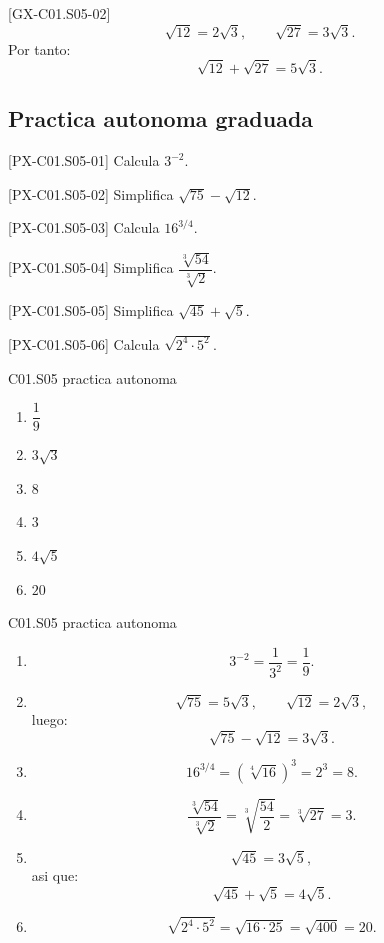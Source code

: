 \begin{fullsolution}{[GX-C01.S05-02]}
\[
\sqrt{12}=2\sqrt{3},\qquad \sqrt{27}=3\sqrt{3}.
\]
Por tanto:
\[
\sqrt{12}+\sqrt{27}=5\sqrt{3}.
\]
\end{fullsolution}

\subsection*{Practica autonoma graduada}
\begin{exercise}{[PX-C01.S05-01] Calcula \(3^{-2}\).}
\end{exercise}
\begin{exercise}{[PX-C01.S05-02] Simplifica \(\sqrt{75}-\sqrt{12}\).}
\end{exercise}
\begin{exercise}{[PX-C01.S05-03] Calcula \(16^{3/4}\).}
\end{exercise}
\begin{exercise}{[PX-C01.S05-04] Simplifica \(\dfrac{\sqrt[3]{54}}{\sqrt[3]{2}}\).}
\end{exercise}
\begin{exercise}{[PX-C01.S05-05] Simplifica \(\sqrt{45}+\sqrt{5}\).}
\end{exercise}
\begin{exercise}{[PX-C01.S05-06] Calcula \(\sqrt{2^4\cdot 5^2}\).}
\end{exercise}

\begin{shortanswer}{C01.S05 practica autonoma}
\begin{enumerate}[label=\textbf{PX-C01.S05-\arabic*:}, leftmargin=*]
  \item \(\dfrac{1}{9}\)
  \item \(3\sqrt{3}\)
  \item \(8\)
  \item \(3\)
  \item \(4\sqrt{5}\)
  \item \(20\)
\end{enumerate}
\end{shortanswer}

\begin{fullsolution}{C01.S05 practica autonoma}
\begin{enumerate}[label=\textbf{PX-C01.S05-\arabic*:}, leftmargin=*]
  \item
  \[
  3^{-2}=\frac{1}{3^2}=\frac{1}{9}.
  \]
  \item
  \[
  \sqrt{75}=5\sqrt{3},\qquad \sqrt{12}=2\sqrt{3},
  \]
  luego:
  \[
  \sqrt{75}-\sqrt{12}=3\sqrt{3}.
  \]
  \item
  \[
  16^{3/4}=\left(\sqrt[4]{16}\right)^3=2^3=8.
  \]
  \item
  \[
  \frac{\sqrt[3]{54}}{\sqrt[3]{2}}=\sqrt[3]{\frac{54}{2}}=\sqrt[3]{27}=3.
  \]
  \item
  \[
  \sqrt{45}=3\sqrt{5},
  \]
  asi que:
  \[
  \sqrt{45}+\sqrt{5}=4\sqrt{5}.
  \]
  \item
  \[
  \sqrt{2^4\cdot 5^2}=\sqrt{16\cdot 25}=\sqrt{400}=20.
  \]
\end{enumerate}
\end{fullsolution}

